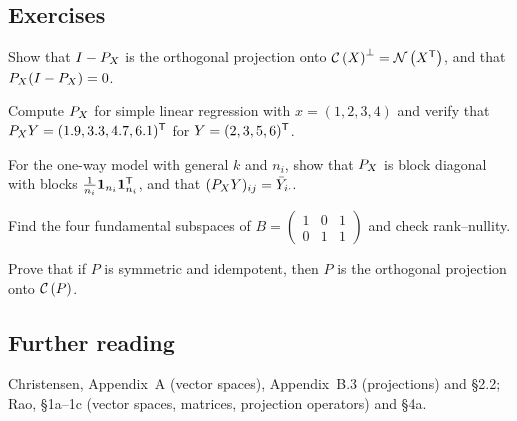\subsection{Exercises}
\begin{problem}\label{prob:L14-1}
Show that $I-P_X$ is the orthogonal projection onto $\mathcal{C}\left(X\right)^\perp=\mathcal{N}\left(X^{\mathsf T}\right)$, and that $P_X(I-P_X)=0$.
\end{problem}
\begin{problem}\label{prob:L14-2}
Compute $P_X$ for simple linear regression with $x=(1,2,3,4)$ and verify that $P_X Y=(1.9,3.3,4.7,6.1)^{\mathsf T}$ for $Y=(2,3,5,6)^{\mathsf T}$.
\end{problem}
\begin{problem}\label{prob:L14-3}
For the one-way model with general $k$ and $n_i$, show that $P_X$ is block diagonal with blocks $\frac1{n_i}\mathbf 1_{n_i}\mathbf 1_{n_i}^{\mathsf T}$, and that $(P_X Y)_{ij}=\bar Y_{i\cdot}$.
\end{problem}
\begin{problem}\label{prob:L14-4}
Find the four fundamental subspaces of $B=\begin{pmatrix}1&0&1\\0&1&1\end{pmatrix}$ and check rank--nullity.
\end{problem}
\begin{problem}\label{prob:L14-5}
Prove that if $P$ is symmetric and idempotent, then $P$ is the orthogonal projection onto $\mathcal{C}\left(P\right)$.
\end{problem}

\subsection{Further reading}
Christensen, Appendix~A (vector spaces), Appendix~B.3 (projections) and \S2.2; Rao, \S1a--1c (vector spaces,
matrices, projection operators) and \S4a.
